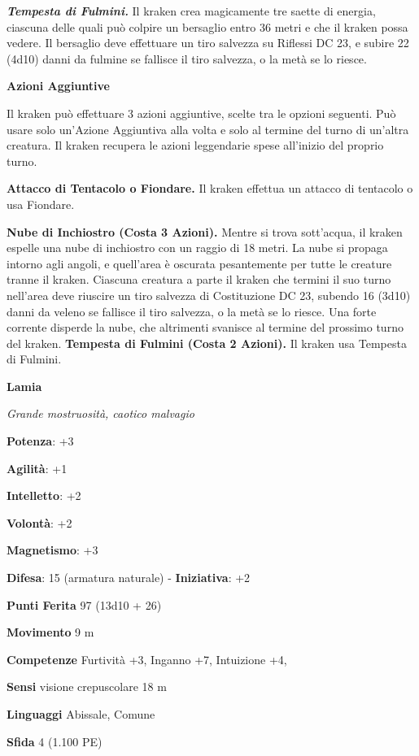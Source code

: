 \begin{multicols}{2}
\emph{\textbf{Tempesta di Fulmini.}} Il kraken crea magicamente tre
saette di energia, ciascuna delle quali può colpire un bersaglio entro
36 metri e che il kraken possa vedere. Il bersaglio deve effettuare un
tiro salvezza su Riflessi DC 23, e subire 22 (4d10) danni da fulmine se
fallisce il tiro salvezza, o la metà se lo riesce.

\textbf{Azioni Aggiuntive}

Il kraken può effettuare 3 azioni aggiuntive, scelte tra le opzioni
seguenti. Può usare solo un'Azione Aggiuntiva alla volta e solo al
termine del turno di un'altra creatura. Il kraken recupera le azioni
leggendarie spese all'inizio del proprio turno.

\textbf{Attacco di Tentacolo o Fiondare.} Il kraken effettua un attacco
di tentacolo o usa Fiondare.

\textbf{Nube di Inchiostro (Costa 3 Azioni).} Mentre si trova
sott'acqua, il kraken espelle una nube di inchiostro con un raggio di 18
metri. La nube si propaga intorno agli angoli, e quell'area è oscurata
pesantemente per tutte le creature tranne il kraken. Ciascuna creatura a
parte il kraken che termini il suo turno nell'area deve riuscire un tiro
salvezza di Costituzione DC 23, subendo 16 (3d10) danni da veleno se
fallisce il tiro salvezza, o la metà se lo riesce. Una forte corrente
disperde la nube, che altrimenti svanisce al termine del prossimo turno
del kraken. \textbf{Tempesta di Fulmini (Costa 2 Azioni).} Il kraken usa
Tempesta di Fulmini.



\textbf{Lamia}

\emph{Grande mostruosità, caotico malvagio}

\textbf{Potenza}: +3

\textbf{Agilità}: +1

\textbf{Intelletto}: +2

\textbf{Volontà}: +2

\textbf{Magnetismo}: +3

\textbf{Difesa}: 15 (armatura naturale) - \textbf{Iniziativa}: +2

\textbf{Punti Ferita} 97 (13d10 + 26)

\textbf{Movimento} 9 m

\textbf{Competenze} Furtività +3, Inganno +7, Intuizione +4,

\textbf{Sensi} visione crepuscolare 18 m

\textbf{Linguaggi} Abissale, Comune

\textbf{Sfida} 4 (1.100 PE)


\end{multicols}
